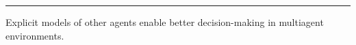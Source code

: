 \begin{frame}
\begin{center}
\begin{tikzpicture}
\end{tikzpicture}
\end{center}

\vspace{0.34em}
\begin{center}
{\color{black!20}\rule{0.78\linewidth}{0.4pt}}

\vspace{0.30em}
{\small
Explicit models of other agents enable
{\color{zhcolor}\selectfont better decision-making}
in multiagent environments.}
\end{center}

\end{frame}
